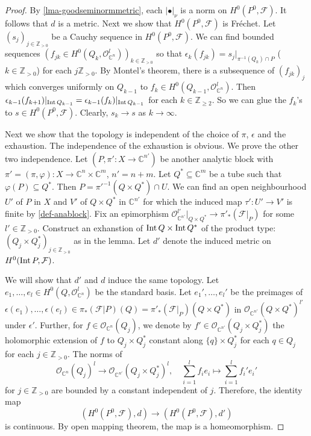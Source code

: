 \begin{proof}
By \cref{lma-goodseminormmetric}, each $|\bullet|_{\nu}$ is a norm on $H^0(P^0, \mathcal{F})$. It follows that $d$ is a metric. Next we show that $H^0(P^0, \mathcal{F})$ is Fréchet. 
Let $(s_j)_{j\in \mathbb{Z}_{>0}}$ be a Cauchy sequence in $H^0(P^0, \mathcal{F})$. We can find bounded sequences $(f_{jk}\in H^0(Q_k,\mathcal{O}^l_{\mathbb{C}^n}))_{k\in \mathbb{Z}_{>0}}$ so that $\epsilon_k(f_{jk})=s_j|_{\pi^{-1}(Q_k)\cap P}$ ($k\in \mathbb{Z}_{>0}$) for each $j\mathbb{Z}_{>0}$. By Montel's theorem, there is a subsequence of $(f_{jk})_j$ which converges uniformly on $Q_{k-1}$ to $f_k\in H^0(Q_{k-1},\mathcal{O}_{\mathbb{C}^n}^l)$. Then $\epsilon_{k-1}(f_{k+1})|_{\operatorname{Int} Q_{k-1}}=\epsilon_{k-1}(f_k)|_{\operatorname{Int} Q_{k-1}}$ for each $k\in \mathbb{Z}_{\geq 2}$. So we can glue the $f_k$'s to $s\in H^0(P^0,\mathcal{F})$. Clearly, $s_k\to s$ as $k\to\infty$.

Next we show that the topology is independent of the choice of $\pi$, $\epsilon$ and the exhaustion. 
The independence of the exhaustion is obvious. We prove the other two independence.
Let $(P,\pi':X\rightarrow \mathbb{C}^{n'})$ be another analytic block with $\pi'=(\pi,\varphi):X\rightarrow \mathbb{C}^n\times \mathbb{C}^m$, $n'=n+m$. Let $Q^*\subseteq \mathbb{C}^m$ be a tube such that $\varphi(P)\subseteq Q^*$. Then $P=\pi'^{-1}(Q\times Q^*)\cap U$. We can find an open neighbourhood $U'$ of $P$ in $X$ and $V'$ of $Q\times Q^*$ in $\mathbb{C}^{n'}$ for which the induced map $\tau':U'\rightarrow V'$ is finite by \cref{def-anablock}. Fix an epimorphism $\mathcal{O}_{\mathbb{C}^{n'}}^{l'}|_{Q\times Q^*}\rightarrow \pi'_*(\mathcal{F}|_P)$ for some $l'\in \mathbb{Z}_{>0}$. Construct an exhanstion of $\operatorname{Int} Q\times \operatorname{Int} Q^*$ of the product type: $(Q_j\times Q_j^*)_{j\in \mathbb{Z}_{>0}}$ as in the lemma. Let $d'$ denote the induced metric on $H^0(\operatorname{Int} P,\mathcal{F})$.


We will show that $d'$ and $d$ induce the same topology. Let $e_1,\ldots,e_l\in H^0(Q,\mathcal{O}_{\mathbb{C}^n}^l)$ be the standard basis.  Let $e_1',\ldots,e_l'$ be the preimages of $\epsilon(e_1),\ldots,\epsilon(e_l)\in \pi_* (\mathcal{F}|P)(Q)=\pi'_*(\mathcal{F}|_P)(Q\times Q^*)$ in $\mathcal{O}_{\mathbb{C}^{n'}}(Q\times Q^*)^{l'}$ under $\epsilon'$. Further, for $f\in \mathcal{O}_{\mathbb{C}^n}(Q_j)$, we denote by $f'\in\mathcal{O}_{\mathbb{C}^{n'}}(Q_j\times Q_j^*)$ the holomorphic extension of $f$ to $Q_j\times Q_j^*$ constant along $\{q\}\times Q_j^*$ for each $q\in Q_j$  for each $j\in \mathbb{Z}_{>0}$. The norms of 
\[
\mathcal{O}_{\mathbb{C}^n}(Q_j)^l\rightarrow \mathcal{O}_{\mathbb{C}^{n'}}(Q_j\times Q_j^*)^l,\quad \sum_{i=1}^l f_i e_i\mapsto \sum_{i=1}^l f_i' e_i'    
\]
for $j\in \mathbb{Z}_{>0}$ are bounded by a constant independent of $j$. Therefore, the identity map 
\[
  (H^0(P^0,\mathcal{F}),d)  \rightarrow (H^0(P^0,\mathcal{F}),d')
\] 
is continuous. By open mapping theorem, the map is a homeomorphism.
\end{proof}

